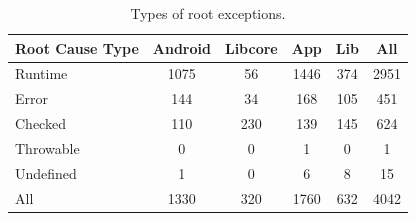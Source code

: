 \documentclass[conference]{IEEEtran}
\begin{document}
\begin{table}
\centering
\begin{tabular}{lccccc}
    \hline
    \bfseries{Root Cause Type} & \bfseries{Android} & \bfseries{Libcore} & \bfseries{App} & \bfseries{Lib}  & \bfseries{All}\\
    \hline

Runtime	&	1075	&	56	&	1446	&	374	&	2951\\
Error	&	144	&	34	&	168	&	105	&		451	\\
Checked	&	110	&	230	&	139	&	145	&	624	\\
Throwable	&	0	&	0	&	1	&	0	&	1	\\
Undefined	&	1	&	0	&	6	&	8	&	15	\\
    \hline
All		& 1330	&	320	&	1760	&	632	&	4042	\\
    \hline
  \end{tabular}
\caption{Types of root exceptions.}
  \label{tab:typeroottab}
\end{table}




\end{document}
